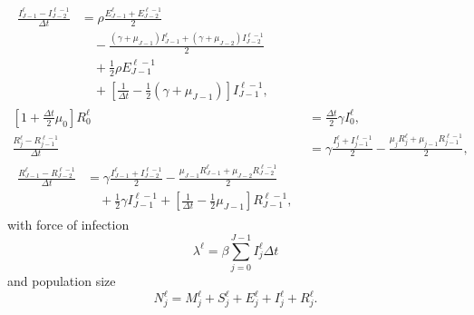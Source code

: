 \documentclass{jpmarticle}
\let\subequationsorig\subequations%
\let\endsubequationsorig\endsubequations%
\renewenvironment{subequations}{
  \subequationsorig
  \renewcommand{\theequation}{\theparentequation.\arabic{equation}}
}{
  \endsubequationsorig
}
\begin{document}
\begin{subequations}
\begin{align}
    \begin{split}
      \frac{I_{J - 1}^{\ell} - I_{J - 2}^{\ell - 1}}{\Delta t} &=
      \rho \frac{E_{J - 1}^{\ell} + E_{J - 2}^{\ell - 1}}{2}
      \\ & \quad {}
      - \frac{(\gamma + \mu_{J - 1}) I_{J - 1}^{\ell}
        + (\gamma + \mu_{J - 2}) I_{J - 2}^{\ell - 1}}{2}
      \\ & \quad {}
      + \frac{1}{2} \rho E_{J - 1}^{\ell - 1}
      \\ & \quad {}
      + \left[
        \frac{1}{\Delta t} - \frac{1}{2} (\gamma + \mu_{J - 1})
      \right] I_{J - 1}^{\ell - 1},
    \end{split}
    \\
    \left[1 + \frac{\Delta t}{2} \mu_0\right] R_0^{\ell}
    &= \frac{\Delta t}{2} \gamma I_0^{\ell},
    \\
    \frac{R_j^{\ell} - R_{j - 1}^{\ell - 1}}{\Delta t} &=
    \gamma \frac{I_j^{\ell} + I_{j - 1}^{\ell - 1}}{2}
    - \frac{\mu_j R_j^{\ell} + \mu_{j - 1} R_{j - 1}^{\ell - 1}}{2},
    \\
    \begin{split}
      \frac{R_{J - 1}^{\ell} - R_{J - 2}^{\ell - 1}}{\Delta t} &=
      \gamma \frac{I_{J - 1}^{\ell} + I_{J - 2}^{\ell - 1}}{2}
      - \frac{\mu_{J - 1} R_{J - 1}^{\ell}
        + \mu_{J - 2} R_{J - 2}^{\ell - 1}}{2}
      \\ & \quad {}
      + \frac{1}{2}
      \gamma I_{J - 1}^{\ell - 1}
      + \left[
        \frac{1}{\Delta t} - \frac{1}{2} \mu_{J - 1}
      \right] R_{J - 1}^{\ell - 1},
    \end{split}
  \end{align}
  with force of infection
  \begin{equation}
    \lambda^{\ell} =
    \beta \sum_{j = 0}^{J - 1} I_j^{\ell} \Delta t
  \end{equation}
  and population size
  \begin{equation}
    N_j^{\ell} =
    M_j^{\ell} + S_j^{\ell} + E_j^{\ell} + I_j^{\ell} + R_j^{\ell}.
  \end{equation}
\end{subequations}
\end{document}
